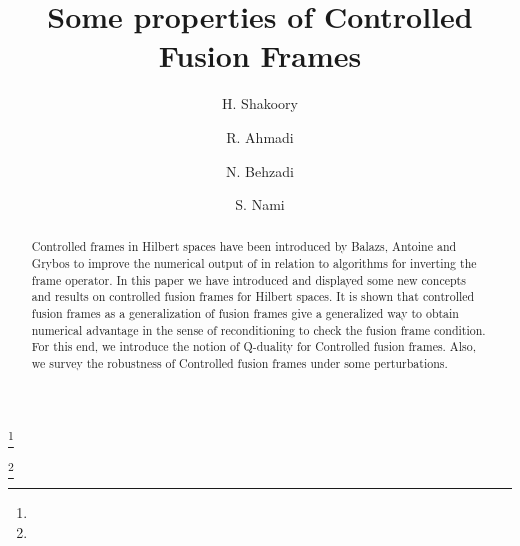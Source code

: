 \documentclass{mfatshort}
\begin{document}
\title[Controlled Fusion Frames]
	{Some properties of Controlled Fusion Frames}

\author{H. Shakoory}
\address{Department of Mathematics\\ Shabestar Branch\\ Islamic Azad University\\ Shabestar\\ Iran.}
\curraddr{}
\thanks{}

\author{R. Ahmadi}
\address{Institute of Fundamental Sciences\\University of Tabriz\\, Iran\\}
\thanks{}

\author{N. Behzadi}
\address{Institute of Fundamental Sciences\\University of Tabriz\\, Iran\\}
\author{S. Nami}
\address{Faculty of Physic\\University of Tabriz\\, Iran\\}
\date{}
\dedicatory{}

\begin{abstract}
Controlled frames in Hilbert spaces  have been  introduced by Balazs, Antoine and Grybos  to improve the numerical output of in relation to algorithms for inverting the frame operator.  In this paper we have introduced and displayed some new concepts and results on controlled  fusion frames for Hilbert spaces. It is shown that controlled fusion frames as a generalization of fusion frames give a generalized way to obtain numerical advantage in the sense of reconditioning to check the fusion frame condition. For this end, we introduce the notion of Q-duality for Controlled fusion frames. Also, we survey the robustness of Controlled fusion frames under some perturbations.

\end{abstract}
\maketitle
\end{document}
